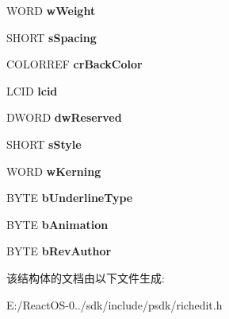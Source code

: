 \begin{DoxyCompactItemize}
\item 
\mbox{\label{struct__charformat2w_a3f720757b3b3178043735cb1ec3ed1e3}} 
W\+O\+RD {\bfseries w\+Weight}
\item 
\mbox{\label{struct__charformat2w_a811e9fe9be67a1cd90ada9964c3bfc7a}} 
S\+H\+O\+RT {\bfseries s\+Spacing}
\item 
\mbox{\label{struct__charformat2w_ac2d0d082772e7d81c8369d5fc8cda1d7}} 
C\+O\+L\+O\+R\+R\+EF {\bfseries cr\+Back\+Color}
\item 
\mbox{\label{struct__charformat2w_aac055d3bf2407a8a8d2cd0a915a51391}} 
L\+C\+ID {\bfseries lcid}
\item 
\mbox{\label{struct__charformat2w_a02b42b1f281dbac0cf4400168f748e1a}} 
D\+W\+O\+RD {\bfseries dw\+Reserved}
\item 
\mbox{\label{struct__charformat2w_a81c3316e9beb6e219de582bd9a3a547a}} 
S\+H\+O\+RT {\bfseries s\+Style}
\item 
\mbox{\label{struct__charformat2w_a3bbc7f4b726c82f3305ef088043a2c6a}} 
W\+O\+RD {\bfseries w\+Kerning}
\item 
\mbox{\label{struct__charformat2w_a95eb5dad31deca23c2626ac500730760}} 
B\+Y\+TE {\bfseries b\+Underline\+Type}
\item 
\mbox{\label{struct__charformat2w_a33c7a902a789134955b82fc686286d4e}} 
B\+Y\+TE {\bfseries b\+Animation}
\item 
\mbox{\label{struct__charformat2w_a8d6bc14b9554cb614b40732754e47873}} 
B\+Y\+TE {\bfseries b\+Rev\+Author}
\end{DoxyCompactItemize}


该结构体的文档由以下文件生成\+:\begin{DoxyCompactItemize}
\item 
E\+:/\+React\+O\+S-\/0../sdk/include/psdk/richedit.\+h\end{DoxyCompactItemize}
